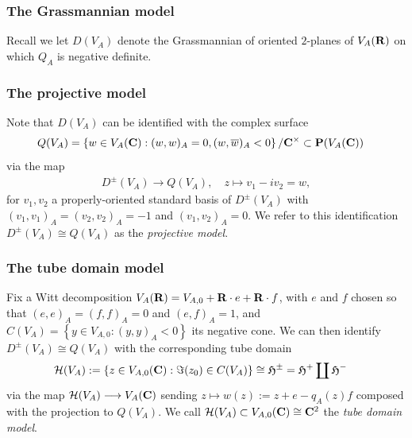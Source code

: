 \documentclass{amsart}
\theoremstyle{definition}
\begin{document}
\subsubsection{The Grassmannian model}    
     
Recall we let $D(V_A)$ denote the Grassmannian of oriented $2$-planes of $V_A({\bf{R}})$ on which $Q_A$ is negative definite.

\subsubsection{The projective model}

Note that $D(V_A)$ can be identified with the complex surface  
\begin{align*} Q(V_A) &= \left\lbrace w \in V_A({\bf{C}}) : (w, w)_A = 0, (w, \overline{w})_A < 0 \right\rbrace / {\bf{C}}^{\times} \subset {\bf{P}} (V_A({\bf{C}})) \end{align*}
via the map 
\begin{align}\label{quadric} D^{\pm}(V_A) \longrightarrow Q(V_A), \quad z \longmapsto v_1 - i v_2 = w, \end{align}
for $v_1, v_2$ a properly-oriented standard basis of $D^{\pm}(V_A)$ with $(v_1, v_1)_A = (v_2, v_2)_A =-1$ 
and $(v_1, v_2)_A = 0$. We refer to this identification $D^{\pm}(V_A) \cong Q(V_A)$ as the {\it{projective model}}. 

\subsubsection{The tube domain model}

Fix a Witt decomposition $V_A({\bf{R}}) = V_{A, 0} + {\bf{R}} \cdot e + {\bf{R}} \cdot f$,
with $e$ and $f$ chosen so that $(e, e)_A = (f, f)_A= 0$ and $(e, f)_A =1$, 
and $C(V_A) = \left\lbrace y \in V_{A, 0}: (y, y)_A < 0 \right\rbrace$ its negative cone. 
We can then identify $D^{\pm}(V_A) \cong Q(V_A)$ with the corresponding tube domain
\begin{align*}\mathcal{H}(V_A) 
&:= \left\lbrace z \in V_{A, 0}({\bf{C}}) : \Im(z_0) \in C(V_A)  \right\rbrace \cong \mathfrak{H}^{\pm} = \mathfrak{H}^{+} \coprod \mathfrak{H}^{-} \end{align*}
via the map $\mathcal{H}(V_A) \longrightarrow V_A({\bf{C}})$ sending $ z \longmapsto w(z) := z + e - q_A(z) f$ 
composed with the projection to $Q(V_A)$. We call $\mathcal{H}(V_A) \subset V_{A, 0}({\bf{C}}) \cong {\bf{C}}^2$ the {\it{tube domain model}}. 
\end{document}
